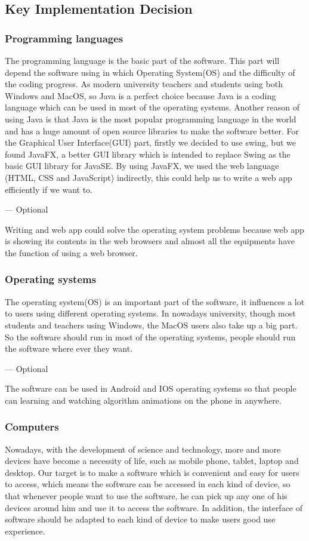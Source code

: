\documentclass[paper=a4, fontsize=11pt,twoside]{scrartcl}		%
\begin{document}
\subsection{Key Implementation Decision} 
\subsubsection{Programming languages}
The programming language is the basic part of the software. This part will depend the software using in which Operating System(OS) and the difficulty of the coding progress. As modern university teachers and students using both Windows and MacOS, so Java is a perfect choice because Java is a coding language which can be used in most of the operating systems. Another reason of using Java is that Java is the most popular programming language in the world and has a huge amount of open source libraries to make the software better. For the Graphical User Interface(GUI) part, firstly we decided to use swing, but we found JavaFX, a better GUI library which is intended to replace Swing as the basic GUI library for JavaSE. By using JavaFX, we used the web language (HTML, CSS and JavaScript) indirectly, this could help us to write a web app efficiently if we want to.

--- Optional

Writing and web app could solve the operating system problems because web app is showing its contents in the web browsers and almost all the equipments have the function of using a web browser.

\subsubsection{Operating systems}
The operating system(OS) is an important part of the software, it influences a lot to users using different operating systems. In nowadays university, though most students and teachers using Windows, the MacOS users also take up a big part. So the software should run in most of the operating systems, people should run the software where ever they want.

--- Optional

The software can be used in Android and IOS operating systems so that people can learning and watching algorithm animations on the phone in anywhere.

\subsubsection{Computers}
Nowadays, with the development of science and technology, more and more devices have become a necessity of life, such as mobile phone, tablet, laptop and desktop. Our target is to make a software which is 
convenient and easy for users to access, which means the software can be accessed in each kind of device, so that whenever people want to use the software, he can pick up any one of his devices around him and use it to access the software. In addition, the interface of software should be adapted to each kind of device to make users good use experience.
\end{document}
